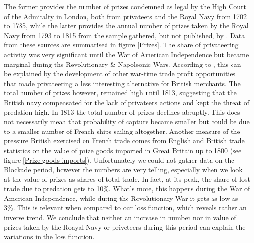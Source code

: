 \documentclass[12pt,a4paper,notitlepage,english]{article}
\begin{document}
The former provides the number of prizes condemned as legal by the High Court of the Admiralty in London, both from privateers and the Royal Navy from 1702 to 1785, while the latter provides the annual number of prizes taken by the Royal Navy from 1793 to 1815 from the sample gathered, but not published, by \cite{Hill1998}.
Data from these sources are summarised in figure \ref{Prizes}.
The share of privateering activity was very significant until the War of American Independence but became marginal during the Revolutionary \& Napoleonic Wars. According to \cite{Hillmann2011}, this can be explained by the development of other war-time trade profit opportunities that made privateering a less interesting alternative for British merchants. The total number of prizes however, remained high until 1813, suggesting that the British navy compensated for the lack of privateers actions and kept the threat of predation high.
In 1813 the total number of prizes declines abruptly. This does not necessarily mean that probability of capture became smaller but could be due to a smaller number of French ships sailing altogether. 
Another measure of the pressure British exercised on French trade comes from English and British trade statistics on the value of prize goods imported in Great Britain up to 1800 (see figure \ref{Prize goods imports}). Unfortunately we could not gather data on the Blockade period, however the numbers are very telling, especially when we look at the value of prizes as shares of total trade. In fact, at its peak, the share of lost trade due to predation gets to 10\%. What's more, this happens during the War of American Independence, while during the Revolutionary War it gets as low as 3\%. This is relevant when compared to our loss function, which reveals rather an inverse trend. We conclude that neither an increase in number nor in value of prizes taken by the Roayal Navy or priveteers during this period can explain the variations in the loss function. 
\end{document}
